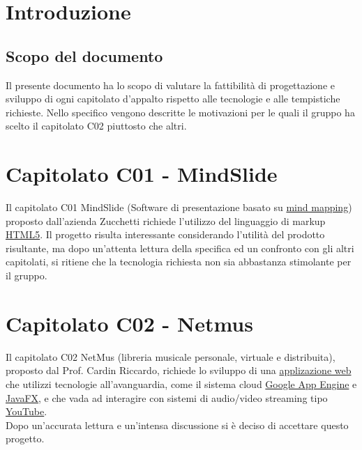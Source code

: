 
\chapter{Introduzione}
\thispagestyle{fancy} %

\section{Scopo del documento}
Il presente documento ha lo scopo di valutare la fattibilit\`a di progettazione
e sviluppo di ogni capitolato d'appalto rispetto alle tecnologie e alle
tempistiche richieste. Nello specifico vengono descritte le motivazioni per le
quali il gruppo ha scelto il capitolato C02 piuttosto che altri.




\chapter{Capitolato C01 - MindSlide}
\thispagestyle{fancy}
Il capitolato C01 MindSlide (Software di presentazione basato su \underline{mind
mapping}) proposto dall'azienda Zucchetti richiede l'utilizzo del linguaggio di
markup \underline{HTML5}.
Il progetto risulta interessante considerando l'utilit\`a del prodotto
risultante, ma dopo un'attenta lettura della specifica ed un confronto con gli
altri capitolati, si ritiene che la tecnologia richiesta non sia abbastanza
stimolante per il gruppo.

\chapter{Capitolato C02 - Netmus}
\thispagestyle{fancy}
Il capitolato C02 NetMus (libreria musicale personale, virtuale e distribuita),
proposto dal Prof. Cardin Riccardo, richiede lo sviluppo di una
\underline{applizazione web} che utilizzi tecnologie all'avanguardia, come il
sistema cloud \underline{Google App Engine} e \underline{JavaFX}, e che vada ad
interagire con sistemi di audio/video streaming tipo \underline{YouTube}.\\

Dopo un'accurata lettura e un'intensa discussione si \`e deciso di accettare
questo progetto.

